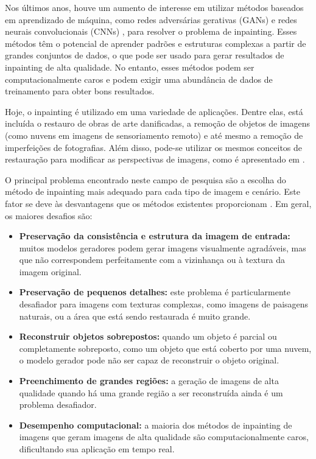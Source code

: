 Nos últimos anos, houve um aumento de interesse em utilizar métodos baseados em aprendizado de máquina, como redes adversárias gerativas (GANs) e redes neurais convolucionais (CNNs) \cite{pathakCVPR16context}, para resolver o problema de inpainting. Esses métodos têm o potencial de aprender padrões e estruturas complexas a partir de grandes conjuntos de dados, o que pode ser usado para gerar resultados de inpainting de alta qualidade. No entanto, esses métodos podem ser computacionalmente caros e podem exigir uma abundância de dados de treinamento para obter bons resultados.

Hoje, o inpainting é utilizado em uma variedade de aplicações. Dentre elas, está incluída o restauro de obras de arte danificadas, a remoção de objetos de imagens (como nuvens em imagens de sensoriamento remoto) e até mesmo a
remoção de imperfeições de fotografias. Além disso, pode-se utilizar os mesmos conceitos de restauração para modificar as perspectivas de imagens, como é apresentado em \cite{huang2014image}.

O principal problema encontrado neste campo de pesquisa são a escolha do método de inpainting mais adequado para cada tipo de imagem e cenário. Este fator se deve às desvantagens que os métodos existentes proporcionam \cite{Salem2021}. Em geral, os maiores desafios são:
\begin{itemize} 
  \item \textbf{Preservação da consistência e estrutura da imagem de entrada:} muitos modelos geradores podem gerar imagens visualmente agradáveis, mas que não correspondem perfeitamente com a vizinhança ou à textura da imagem original.
  \item \textbf{Preservação de pequenos detalhes:} este problema é particularmente desafiador para imagens com texturas complexas, como imagens de paisagens naturais, ou a área que está sendo restaurada é muito grande.
  \item \textbf{Reconstruir objetos sobrepostos:} quando um objeto é parcial ou completamente sobreposto, como um objeto que está coberto por uma nuvem, o modelo gerador pode não ser capaz de reconstruir o objeto original.
  \item \textbf{Preenchimento de grandes regiões:} a geração de imagens de alta qualidade quando há uma grande região a ser reconstruída ainda é um problema desafiador.
  \item \textbf{Desempenho computacional:} a maioria dos métodos de inpainting de imagens que geram imagens de alta qualidade são computacionalmente caros, dificultando sua aplicação em tempo real.
\end{itemize}


